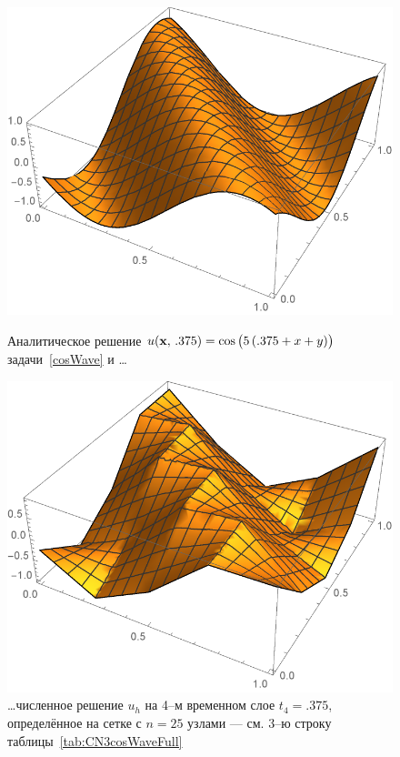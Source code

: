 \begin{figure}[!hb]
	\includegraphics[width=\linewidth]{img/cosWaveAnalytic.pdf}
	\caption{Аналитическое решение $u(\boldsymbol{\mathbf{x}}, \, .375) = \cos \big( 5 \, (.375 + x + y) \big)$ задачи~\ref{cosWave} и \dots}\label{fig:cosWaveAnalytic.pdf}
	\endminipage\hfill
	\includegraphics[width=\linewidth]{img/cosWaveNumeric.pdf}
	\caption{\dots численное решение $u_h$ на 4--м временном слое $t_4 = .375$, определённое на сетке с $n = 25$ узлами --- см. 3--ю строку таблицы~\ref{tab:CN3cosWaveFull}}\label{fig:cosWaveNumeric}
	\endminipage
\end{figure}

